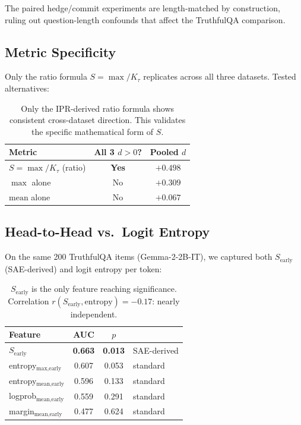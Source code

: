 \documentclass{article}
\begin{document}
The paired hedge/commit experiments are length-matched by construction,
ruling out question-length confounds that affect the TruthfulQA comparison.

\subsection{Metric Specificity}

Only the ratio formula $S = \max / K_\tau$ replicates across all three
datasets. Tested alternatives:

\begin{table}[h]
\centering
\small
\begin{tabular}{lcc}
\toprule
Metric & All 3 $d > 0$? & Pooled $d$ \\
\midrule
$S = \max / K_\tau$ (ratio) & \textbf{Yes} & $+0.498$ \\
$\max$ alone & No & $+0.309$ \\
$\text{mean}$ alone & No & $+0.067$ \\
\bottomrule
\end{tabular}
\caption{Only the IPR-derived ratio formula shows consistent cross-dataset
direction. This validates the specific mathematical form of $S$.}
\label{tab:specificity}
\end{table}

\subsection{Head-to-Head vs.\ Logit Entropy}

On the same 200 TruthfulQA items (Gemma-2-2B-IT), we captured both
$S_\text{early}$ (SAE-derived) and logit entropy per token:

\begin{table}[h]
\centering
\small
\begin{tabular}{lccl}
\toprule
Feature & AUC & $p$ & \\
\midrule
$S_\text{early}$ & \textbf{0.663} & \textbf{0.013} & SAE-derived \\
entropy$_\text{max,early}$ & 0.607 & 0.053 & standard \\
entropy$_\text{mean,early}$ & 0.596 & 0.133 & standard \\
logprob$_\text{mean,early}$ & 0.559 & 0.291 & standard \\
margin$_\text{mean,early}$ & 0.477 & 0.624 & standard \\
\bottomrule
\end{tabular}
\caption{$S_\text{early}$ is the only feature reaching significance.
Correlation $r(S_\text{early}, \text{entropy}) = -0.17$: nearly independent.}
\label{tab:headtohead}
\end{table}
\end{document}
